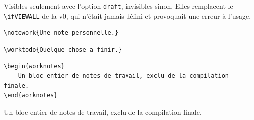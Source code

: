 Visibles seulement avec l'option \texttt{draft}, invisibles sinon. Elles
remplacent le \verb|\ifVIEWALL| de la v0, qui n'était jamais défini et
provoquait une erreur à l'usage.

\begin{lstlisting}
\notework{Une note personnelle.}
\end{lstlisting}

\begin{lstlisting}
\worktodo{Quelque chose a finir.}
\end{lstlisting}

\begin{lstlisting}
\begin{worknotes}
    Un bloc entier de notes de travail, exclu de la compilation finale.
\end{worknotes}
\end{lstlisting}
\begin{worknotes}
    Un bloc entier de notes de travail, exclu de la compilation finale.
\end{worknotes}
